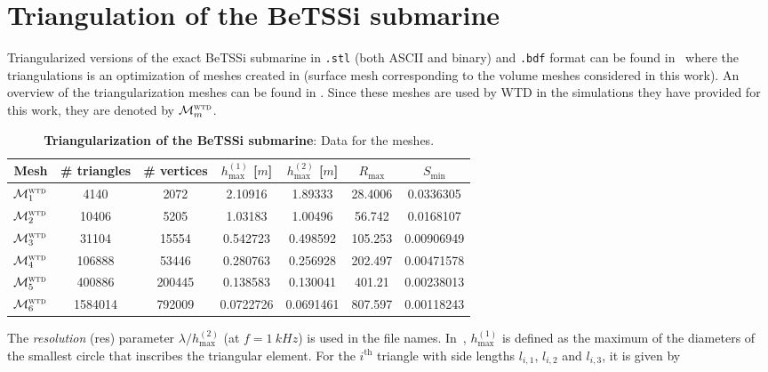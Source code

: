 \section{Triangulation of the BeTSSi submarine}
\label{Sec3:BeTSSi_triangulation}
Triangularized versions of the exact BeTSSi submarine in \texttt{.stl} (both ASCII and binary) and \texttt{.bdf} format can be found in~\cite{Venaas2019bts} where the triangulations is an optimization of meshes created in \COMSOL (surface mesh corresponding to the \COMSOL volume meshes considered in this work). 
An overview of the triangularization meshes can be found in . Since these meshes are used by WTD in the simulations they have provided for this work, they are denoted by ${\cal M}_m^{\textsc{wtd}}$.
\begin{table}
	\centering
	\caption{\textbf{Triangularization of the BeTSSi submarine}: Data for the meshes.}
	\label{Tab3:BeTSSiTriangularization}
	\begin{tabular}{c S[table-format = 8.0] S[table-format = 8.0] S[table-format = 1.3,round-mode=places,round-precision=3] S[table-format = 1.3,round-mode=places,round-precision=3] S[table-format = 3.1,round-mode=places,round-precision=1] S[table-format = 1.4,round-mode=places,round-precision=4]}
		\toprule
		Mesh & {\# triangles} & {\# vertices}  & {$h_{\mathrm{max}}^{(1)}$ [$\si{m}$]}  & {$h_{\mathrm{max}}^{(2)}$ [$\si{m}$]}  & {$R_{\mathrm{max}}$} & {$S_{\mathrm{min}}$}\\
		\hline
		${\cal M}_{1}^{\textsc{wtd}}$ & 4140 & 2072 & 2.10916 & 1.89333 & 28.4006 & 0.0336305\\
		${\cal M}_{2}^{\textsc{wtd}}$ & 10406 & 5205 & 1.03183 & 1.00496 & 56.742 & 0.0168107\\
		${\cal M}_{3}^{\textsc{wtd}}$ & 31104 & 15554 & 0.542723 & 0.498592 & 105.253 & 0.00906949\\
		${\cal M}_{4}^{\textsc{wtd}}$ & 106888 & 53446 & 0.280763 & 0.256928 & 202.497 & 0.00471578\\
		${\cal M}_{5}^{\textsc{wtd}}$ & 400886 & 200445 & 0.138583 & 0.130041 & 401.21 & 0.00238013\\
		${\cal M}_{6}^{\textsc{wtd}}$ & 1584014 & 792009 & 0.0722726 & 0.0691461 & 807.597 & 0.00118243\\
		\bottomrule
	\end{tabular}
\end{table}
The \textit{resolution} (res) parameter $\lambda/h_{\mathrm{max}}^{(2)}$ (at $f = \SI{1}{kHz}$) is used in the file names. In~, $h_{\mathrm{max}}^{(1)}$ is defined as the maximum of the diameters of the smallest circle that inscribes the triangular element. For the $i^{\mathrm{th}}$ triangle with side lengths $l_{i,1}$, $l_{i,2}$ and $l_{i,3}$, it is given by
